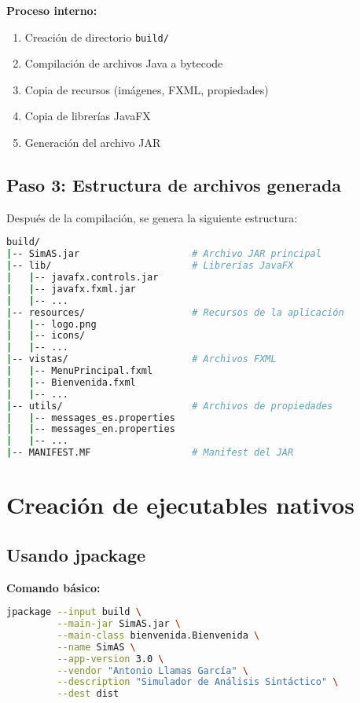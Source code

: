 \textbf{Proceso interno:}

\begin{enumerate}
    \item Creación de directorio \texttt{build/}
    \item Compilación de archivos Java a bytecode
    \item Copia de recursos (imágenes, FXML, propiedades)
    \item Copia de librerías JavaFX
    \item Generación del archivo JAR
\end{enumerate}

\subsection{Paso 3: Estructura de archivos generada}

Después de la compilación, se genera la siguiente estructura:

\begin{lstlisting}[language=bash, caption=Estructura del directorio build]
build/
|-- SimAS.jar                    # Archivo JAR principal
|-- lib/                         # Librerías JavaFX
|   |-- javafx.controls.jar
|   |-- javafx.fxml.jar
|   |-- ...
|-- resources/                   # Recursos de la aplicación
|   |-- logo.png
|   |-- icons/
|   |-- ...
|-- vistas/                      # Archivos FXML
|   |-- MenuPrincipal.fxml
|   |-- Bienvenida.fxml
|   |-- ...
|-- utils/                       # Archivos de propiedades
|   |-- messages_es.properties
|   |-- messages_en.properties
|   |-- ...
|-- MANIFEST.MF                  # Manifest del JAR
\end{lstlisting}

\section{Creación de ejecutables nativos}

\subsection{Usando jpackage}

\textbf{Comando básico:}
\begin{lstlisting}[language=bash, caption=Creación de ejecutable con jpackage]
jpackage --input build \
         --main-jar SimAS.jar \
         --main-class bienvenida.Bienvenida \
         --name SimAS \
         --app-version 3.0 \
         --vendor "Antonio Llamas García" \
         --description "Simulador de Análisis Sintáctico" \
         --dest dist
\end{lstlisting}

